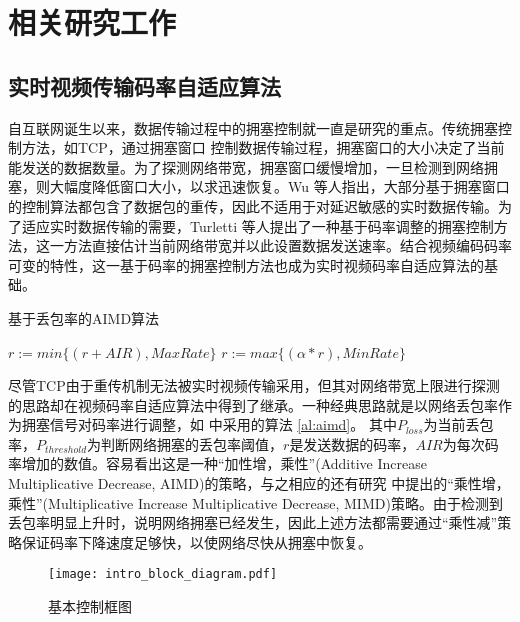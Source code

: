 \chapter{相关研究工作}
\label{chap:related}

\section{实时视频传输码率自适应算法}
自互联网诞生以来，数据传输过程中的拥塞控制就一直是研究的重点。传统拥塞控制方法，如TCP，通过拥塞窗口 \cite{jacobson1988congestion} 控制数据传输过程，拥塞窗口的大小决定了当前能发送的数据数量。为了探测网络带宽，拥塞窗口缓慢增加，一旦检测到网络拥塞，则大幅度降低窗口大小，以求迅速恢复。Wu \cite{wu2000end}等人指出，大部分基于拥塞窗口的控制算法都包含了数据包的重传，因此不适用于对延迟敏感的实时数据传输。为了适应实时数据传输的需要，Turletti \cite{turletti1996videoconferencing} 等人提出了一种基于码率调整的拥塞控制方法，这一方法直接估计当前网络带宽并以此设置数据发送速率。结合视频编码码率可变的特性，这一基于码率的拥塞控制方法也成为实时视频码率自适应算法的基础。

\begin{algorithm}[htbp]
\caption{基于丢包率的AIMD算法}
\label{al:aimd}
    \begin{algorithmic}
        \State $r := min\{(r+AIR), MaxRate \} $
    \Else
        \State $r := max\{(\alpha * r), MinRate \} $
    \EndIf
    \end{algorithmic}
\end{algorithm}

尽管TCP由于重传机制无法被实时视频传输采用，但其对网络带宽上限进行探测的思路却在视频码率自适应算法中得到了继承。一种经典思路就是以网络丢包率作为拥塞信号对码率进行调整，如 \cite{wu2000end} 中采用的算法 \ref{al:aimd}。
其中$P_{loss}$为当前丢包率，$P_{threshold}$为判断网络拥塞的丢包率阈值，$r$是发送数据的码率，$AIR$为每次码率增加的数值。容易看出这是一种``加性增，乘性''(Additive Increase Multiplicative Decrease, AIMD)的策略，与之相应的还有研究 \cite{turletti1996videoconferencing} 中提出的``乘性增，乘性''(Multiplicative Increase Multiplicative Decrease, MIMD)策略。由于检测到丢包率明显上升时，说明网络拥塞已经发生，因此上述方法都需要通过``乘性减''策略保证码率下降速度足够快，以使网络尽快从拥塞中恢复。

\begin{figure}[htbp]
  \centering
  \texttt{[image: intro\_block\_diagram.pdf]}
  \caption{基本控制框图}
  \label{fig:intro_block_diagram}
\end{figure}

